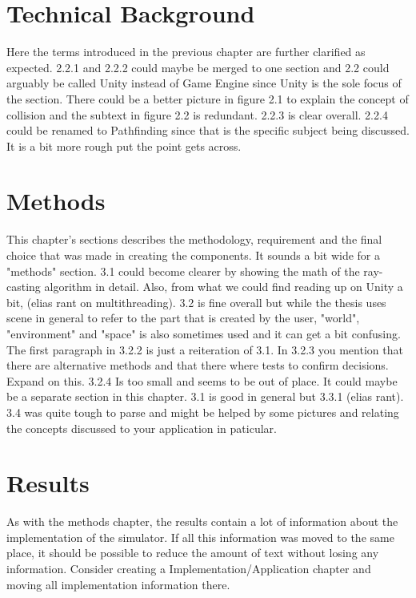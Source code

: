 \documentclass[12pt,a4paper,twoside,openright]{report}
\begin{document}
\section*{Technical Background}

	Here the terms introduced in the previous chapter are further clarified as
	expected. 2.2.1 and 2.2.2 could maybe be merged to one section and 2.2
	could arguably be called Unity instead of Game Engine since Unity is the
	sole focus of the section. There could be a better picture in figure 2.1 to
	explain the concept of collision and the subtext in figure 2.2 is
	redundant. 2.2.3 is clear overall. 2.2.4 could be renamed to Pathfinding
	since that is the specific subject being discussed. It is a bit more rough
	put the point gets across.

\section*{Methods}

	This chapter's sections describes the methodology, requirement and the
	final choice that was made in creating the components. It sounds a bit wide
	for a "methods" section. 3.1 could become clearer by showing the math of
	the ray-casting algorithm in detail. Also, from what we could find reading
	up on Unity a bit, (elias rant on multithreading). 3.2 is fine overall but
	while the thesis uses scene in general to refer to the part that is created
	by the user, "world", "environment" and "space" is also sometimes used and
	it can get a bit confusing. The first paragraph in 3.2.2 is just a
	reiteration of 3.1. In 3.2.3 you mention that there are alternative methods
	and that there where tests to confirm decisions. Expand on this. 3.2.4 Is
	too small and seems to be out of place. It could maybe be a separate
	section in this chapter. 3.1 is good in general but 3.3.1 (elias rant). 3.4
	was quite tough to parse and might be helped by some pictures and relating
	the concepts discussed to your application in paticular.

\section*{Results}

	As with the methods chapter, the results contain a lot of information about
	the implementation of the simulator. If all this information was moved to
	the same place, it should be possible to reduce the amount of text without
	losing any information. Consider creating a Implementation/Application 
	chapter and moving all implementation information there.
\end{document}
